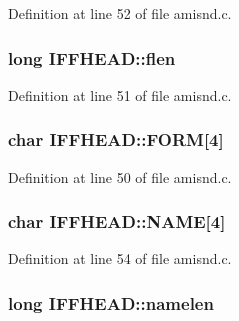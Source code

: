 Definition at line 52 of file amisnd.\+c.

\hypertarget{structIFFHEAD_a5c34244e80a2c81e1096c809363a6b7b}{
\subsubsection[{flen}]{\setlength{\rightskip}{0pt plus 5cm}long I\+F\+F\+H\+E\+A\+D\+::flen}}\label{structIFFHEAD_a5c34244e80a2c81e1096c809363a6b7b}


Definition at line 51 of file amisnd.\+c.

\hypertarget{structIFFHEAD_a1e1a5d0068bed540b3b6e9fadd317847}{
\subsubsection[{F\+O\+R\+M}]{\setlength{\rightskip}{0pt plus 5cm}char I\+F\+F\+H\+E\+A\+D\+::\+F\+O\+R\+M\mbox{[}4\mbox{]}}}\label{structIFFHEAD_a1e1a5d0068bed540b3b6e9fadd317847}


Definition at line 50 of file amisnd.\+c.

\hypertarget{structIFFHEAD_ad97eaa6fc9bd846b458123b6aa216417}{
\subsubsection[{N\+A\+M\+E}]{\setlength{\rightskip}{0pt plus 5cm}char I\+F\+F\+H\+E\+A\+D\+::\+N\+A\+M\+E\mbox{[}4\mbox{]}}}\label{structIFFHEAD_ad97eaa6fc9bd846b458123b6aa216417}


Definition at line 54 of file amisnd.\+c.

\hypertarget{structIFFHEAD_acc3ec2069100de25d0d5f5c769828a0c}{
\subsubsection[{namelen}]{\setlength{\rightskip}{0pt plus 5cm}long I\+F\+F\+H\+E\+A\+D\+::namelen}}\label{structIFFHEAD_acc3ec2069100de25d0d5f5c769828a0c}


